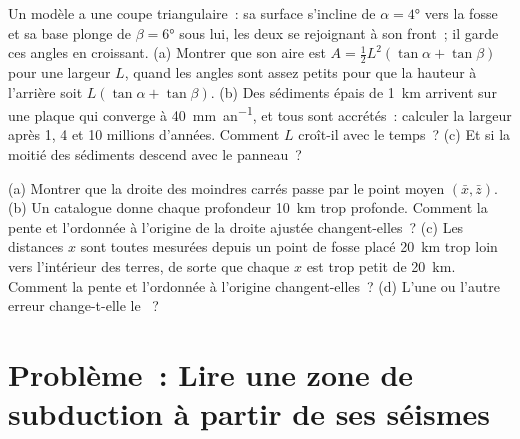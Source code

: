 \begin{exercise}[$\star\star\star$]\label{exo:b1:active-margins:11}
Un  modèle a une coupe triangulaire~: sa surface s'incline de
$\alpha = \ang{4}$ vers la fosse et sa base plonge de $\beta = \ang{6}$
sous lui, les deux se rejoignant à son front~; il garde ces angles en croissant. (a)
Montrer que son aire est $A = \frac12 L^2(\tan\alpha + \tan\beta)$ pour une largeur
$L$, quand les angles sont assez petits pour que la hauteur à l'arrière soit
$L(\tan\alpha + \tan\beta)$. (b) Des sédiments épais de \qty{1}{km} arrivent sur une plaque
qui converge à \qty{40}{mm.an^{-1}}, et tous sont accrétés~: calculer la
largeur après 1, 4 et 10 millions d'années. Comment $L$ croît-il avec le temps~? (c) Et
si la moitié des sédiments descend avec le panneau~?
\end{exercise}

\begin{exercise}[$\star\star\star$]\label{exo:b1:active-margins:12}
(a) Montrer que la droite des moindres carrés passe par le point moyen
$(\bar x, \bar z)$. (b) Un catalogue donne chaque profondeur \qty{10}{km} trop profonde.
Comment la pente et l'ordonnée à l'origine de la droite ajustée changent-elles~? (c) Les distances
$x$ sont toutes mesurées depuis un point de fosse placé \qty{20}{km} trop loin vers
l'intérieur des terres, de sorte que chaque $x$ est trop petit de \qty{20}{km}. Comment la pente et
l'ordonnée à l'origine changent-elles~? (d) L'une ou l'autre erreur change-t-elle le ~?
\end{exercise}

\section{Problème~: Lire une zone de subduction à partir de ses séismes}

